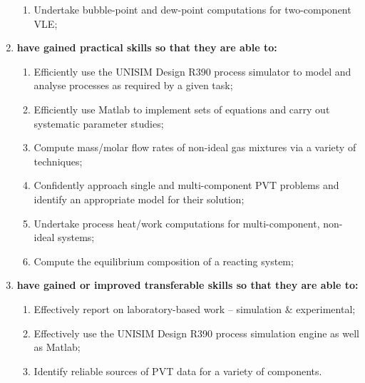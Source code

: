 \documentclass[12pts,a4paper,amsmath,amssymb,floatfix]{article}%
\begin{document}
\begin{enumerate}[{\bf A.}]
\begin{enumerate}
    \item Undertake bubble-point and dew-point computations for two-component VLE;
  \end{enumerate}
\item {\bf have gained practical skills so that they are able to:}
  \begin{enumerate}
    \item Efficiently use the UNISIM Design R390 process simulator to model and analyse processes as required by a given task;
    \item Efficiently use Matlab to implement sets of equations and carry out systematic parameter studies;
    \item Compute mass/molar flow rates of non-ideal gas mixtures via a variety of techniques;
    \item Confidently approach single and multi-component PVT problems and identify an appropriate model for their solution;
    \item Undertake process heat/work computations for multi-component, non-ideal systems;
    \item Compute the equilibrium composition of a reacting system;
  \end{enumerate}
\item {\bf have gained or improved transferable skills so that they are able to:}
  \begin{enumerate}
    \item Effectively report on laboratory-based work – simulation $\&$ experimental;
    \item Effectively use the UNISIM Design R390 process simulation engine as well as Matlab;
    \item Identify reliable sources of PVT data for a variety of components.
  \end{enumerate}
\end{enumerate}


\end{document}
